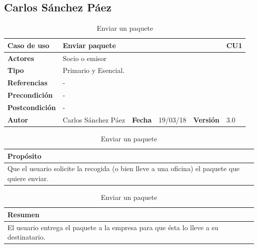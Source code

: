 \documentclass[12pt,spanish]{article}
\begin{document}
\subsection{Carlos Sánchez Páez}

\begin{table}[H]
\centering
\begin{tabular}{|m{3cm}|m{4cm}|m{2cm}|m{2cm}|m{2cm}|m{1cm}|}
\hline
\textbf{Caso de uso} &  \multicolumn{4}{m{8cm}|}{Enviar paquete} \vline &  \cellcolor{gray!40}CU1 \\
\hline
\textbf{Actores} & \multicolumn{5}{m{8cm}|}{Socio o emisor} \\
\hline
\textbf{Tipo} & \multicolumn{5}{m{8cm}|}{Primario y Esencial.} \\
\hline
\textbf{Referencias} &\multicolumn{5}{m{8cm}|}{-}  \\
\hline
\textbf{Precondición} & \multicolumn{5}{m{8cm}|}{-} \\
\hline
\textbf{Postcondición} & \multicolumn{5}{m{8cm}|}{-} \\
\hline
\textbf{Autor} & Carlos Sánchez Páez & \textbf{Fecha} & 19/03/18 & \textbf{Versión} & 3.0 \\
\hline
\end{tabular}

\vspace{1cm}

\begin{tabular}{|m{16.2cm}|}
\hline
\textbf{Propósito} \\
\hline
Que el usuario solicite la recogida (o bien lleve a una oficina) el paquete que quiere enviar. \\
\hline
\end{tabular}

\vspace{1cm}

\begin{tabular}{|m{16.2cm}|}
\hline
\textbf{Resumen} \\
\hline
El usuario entrega el paquete a la empresa para que ésta lo lleve a su destinatario. \\
\hline
\end{tabular}

\caption{Enviar un paquete}
\label{cu:1}
\end{table}

\end{document}

